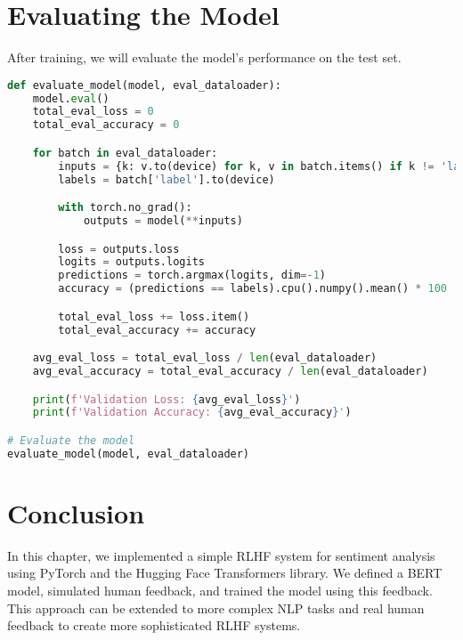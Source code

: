 \section{Evaluating the Model}
After training, we will evaluate the model's performance on the test set.

\begin{lstlisting}[language=python]
def evaluate_model(model, eval_dataloader):
    model.eval()
    total_eval_loss = 0
    total_eval_accuracy = 0

    for batch in eval_dataloader:
        inputs = {k: v.to(device) for k, v in batch.items() if k != 'label'}
        labels = batch['label'].to(device)

        with torch.no_grad():
            outputs = model(**inputs)

        loss = outputs.loss
        logits = outputs.logits
        predictions = torch.argmax(logits, dim=-1)
        accuracy = (predictions == labels).cpu().numpy().mean() * 100

        total_eval_loss += loss.item()
        total_eval_accuracy += accuracy

    avg_eval_loss = total_eval_loss / len(eval_dataloader)
    avg_eval_accuracy = total_eval_accuracy / len(eval_dataloader)

    print(f'Validation Loss: {avg_eval_loss}')
    print(f'Validation Accuracy: {avg_eval_accuracy}')

# Evaluate the model
evaluate_model(model, eval_dataloader)
\end{lstlisting}

\section{Conclusion}
In this chapter, we implemented a simple RLHF system for sentiment analysis using PyTorch and the Hugging Face Transformers library. We defined a BERT model, simulated human feedback, and trained the model using this feedback. This approach can be extended to more complex NLP tasks and real human feedback to create more sophisticated RLHF systems.


